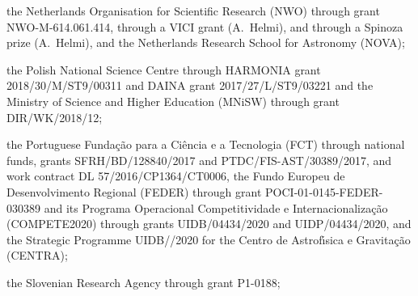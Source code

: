 the Netherlands Organisation for Scientific Research (NWO) through grant NWO-M-614.061.414, through a VICI grant (A.~Helmi), and through a Spinoza prize (A.~Helmi), and the Netherlands Research School for Astronomy (NOVA);

the Polish National Science Centre through HARMONIA grant 2018/30/M/ST9/00311 and DAINA grant 2017/27/L/ST9/03221 and the Ministry of Science and Higher Education (MNiSW) through grant DIR/WK/2018/12;

the Portuguese Funda\c{c}\~{a}o para a Ci\^{e}ncia e a Tecnologia (FCT) through national funds, grants SFRH/\-BD/128840/2017 and PTDC/FIS-AST/30389/2017, and work contract DL 57/2016/CP1364/CT0006, the Fundo Europeu de Desenvolvimento Regional (FEDER) through grant POCI-01-0145-FEDER-030389 and its Programa Operacional Competitividade e Internacionaliza\c{c}\~{a}o (COMPETE2020) through grants UIDB/04434/2020 and UIDP/04434/2020, and the Strategic Programme UIDB//2020 for the Centro de Astrof\'{\i}sica e Gravita\c{c}\~{a}o (CENTRA);  

the Slovenian Research Agency through grant P1-0188;

